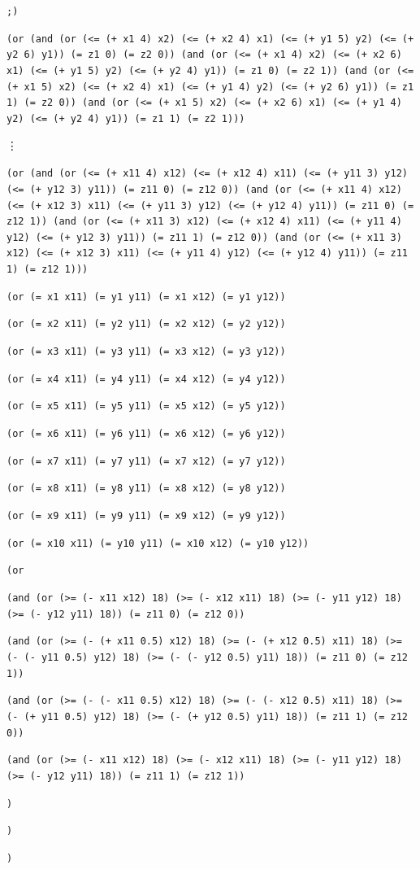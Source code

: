 \documentclass[12pt]{article}
\begin{document}
{{\tt ;) }

{\tt (or (and (or (<= (+ x1 4) x2) (<= (+ x2 4) x1) (<= (+ y1 5) y2) (<= (+ y2 6) y1)) (= z1 0) (= z2 0)) (and (or (<= (+ x1 4) x2) (<= (+ x2 6) x1) (<= (+ y1 5) y2) (<= (+ y2 4) y1)) (= z1 0) (= z2 1)) (and (or (<= (+ x1 5) x2) (<= (+ x2 4) x1) (<= (+ y1 4) y2) (<= (+ y2 6) y1)) (= z1 1) (= z2 0)) (and (or (<= (+ x1 5) x2) (<= (+ x2 6) x1) (<= (+ y1 4) y2) (<= (+ y2 4) y1)) (= z1 1) (= z2 1))) }

\vdots

{\tt (or (and (or (<= (+ x11 4) x12) (<= (+ x12 4) x11) (<= (+ y11 3) y12) (<= (+ y12 3) y11)) (= z11 0) (= z12 0)) (and (or (<= (+ x11 4) x12) (<= (+ x12 3) x11) (<= (+ y11 3) y12) (<= (+ y12 4) y11)) (= z11 0) (= z12 1)) (and (or (<= (+ x11 3) x12) (<= (+ x12 4) x11) (<= (+ y11 4) y12) (<= (+ y12 3) y11)) (= z11 1) (= z12 0)) (and (or (<= (+ x11 3) x12) (<= (+ x12 3) x11) (<= (+ y11 4) y12) (<= (+ y12 4) y11)) (= z11 1) (= z12 1))) }

{\tt  }

{\tt (or (= x1 x11) (= y1 y11) (= x1 x12) (= y1 y12)) }

{\tt (or (= x2 x11) (= y2 y11) (= x2 x12) (= y2 y12)) }

{\tt (or (= x3 x11) (= y3 y11) (= x3 x12) (= y3 y12)) }

{\tt (or (= x4 x11) (= y4 y11) (= x4 x12) (= y4 y12)) }

{\tt (or (= x5 x11) (= y5 y11) (= x5 x12) (= y5 y12)) }

{\tt (or (= x6 x11) (= y6 y11) (= x6 x12) (= y6 y12)) }

{\tt (or (= x7 x11) (= y7 y11) (= x7 x12) (= y7 y12)) }

{\tt (or (= x8 x11) (= y8 y11) (= x8 x12) (= y8 y12)) }

{\tt (or (= x9 x11) (= y9 y11) (= x9 x12) (= y9 y12)) }

{\tt (or (= x10 x11) (= y10 y11) (= x10 x12) (= y10 y12)) }

{\tt  }

{\tt (or }

{\tt (and (or (>= (- x11 x12) 18) (>= (- x12 x11) 18) (>= (- y11 y12) 18) (>= (- y12 y11) 18)) (= z11 0) (= z12 0)) }

{\tt (and (or (>= (- (+ x11 0.5) x12) 18) (>= (- (+ x12 0.5) x11) 18) (>= (- (- y11 0.5) y12) 18) (>= (- (- y12 0.5) y11) 18)) (= z11 0) (= z12 1)) }

{\tt (and (or (>= (- (- x11 0.5) x12) 18) (>= (- (- x12 0.5) x11) 18) (>= (- (+ y11 0.5) y12) 18) (>= (- (+ y12 0.5) y11) 18)) (= z11 1) (= z12 0)) }

{\tt (and (or (>= (- x11 x12) 18) (>= (- x12 x11) 18) (>= (- y11 y12) 18) (>= (- y12 y11) 18)) (= z11 1) (= z12 1)) }

{\tt ) }

{\tt  }

{\tt  }

{\tt ) }

{\tt ) }
}
\end{document}
